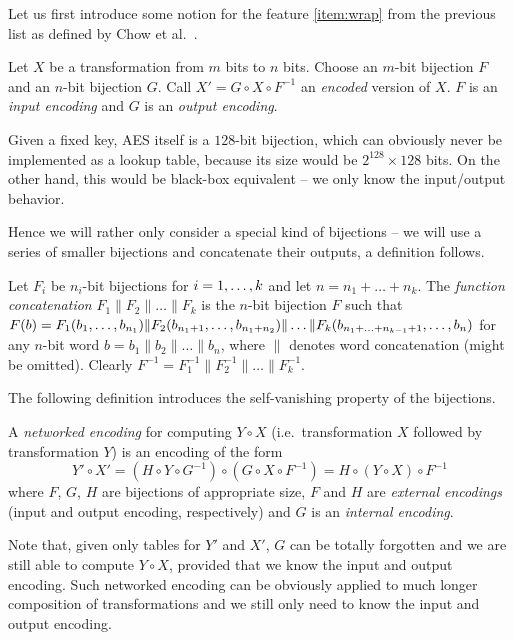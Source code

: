 Let us first introduce some notion for the feature \ref{item:wrap} from the previous list as defined by Chow et al.\ \cite{chow2002aes}.

\begin{defn}[Encoding]
	Let $X$ be a transformation from $m$ bits to $n$ bits. Choose an $m$-bit bijection $F$ and an $n$-bit bijection $G$. Call $X' = G \circ X \circ F^{-1}$ an {\em encoded} version of $X$. $F$ is an {\em input encoding} and $G$ is an {\em output encoding}.
\end{defn}

\begin{note}
	Given a fixed key, AES itself is a $128$-bit bijection, which can obviously never be implemented as a lookup table, because its size would be $2^{128}\times 128$ bits. On the other hand, this would be black-box equivalent -- we only know the input/output behavior.
	
	Hence we will rather only consider a special kind of bijections -- we will use a series of smaller bijections and concatenate their outputs, a definition follows.
\end{note}

\begin{defn}
\label{def:concat}
	Let $F_i$ be $n_i$-bit bijections for $i=1 , \ldots , k$ and let $n = n_1 + \ldots + n_k$. The {\em function concatenation} $F_1 \| F_2 \| \ldots \| F_k$ is the $n$-bit bijection $F$ such that $F(b) = F_1(b_1 , \ldots , b_{n_1})\| F_2(b_{n_1+1} , \ldots , b_{n_1+n_2})\|\ldots\| F_k(b_{n_1+\ldots+n_{k-1}+1} , \ldots , b_n)$ for any $n$-bit word $b=b_1\|b_2\|\ldots\|b_n$, where $\|$ denotes word concatenation (might be omitted). Clearly $F^{-1} = F_1^{-1}\| F_2^{-1}\| \ldots \|F_k^{-1}$.
\end{defn}

The following definition introduces the self-vanishing property of the bijections.

\begin{defn}
\label{def:netw}
	A {\em networked encoding} for computing $Y\circ X$ (i.e.\ transformation $X$ followed by transformation $Y$) is an encoding of the form
	\[
		Y'\circ X' = (H\circ Y\circ G^{-1})\circ(G\circ X\circ F^{-1}) = H\circ(Y\circ X)\circ F^{-1}
	\]
	where $F$, $G$, $H$ are bijections of appropriate size, $F$ and $H$ are {\em external encodings} (input and output encoding, respectively) and $G$ is an {\em internal encoding}.
\end{defn}

Note that, given only tables for $Y'$ and $X'$, $G$ can be totally forgotten and we are still able to compute $Y\circ X$, provided that we know the input and output encoding. Such networked encoding can be obviously applied to much longer composition of transformations and we still only need to know the input and output encoding.


